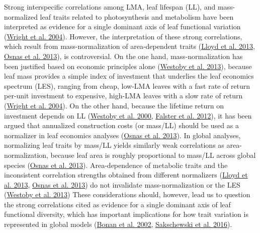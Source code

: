 \documentclass[
  12pt,
  a4paper,
,tablecaptionabove
]{scrartcl}
\begin{document}
Strong interspecific correlations among LMA, leaf lifespan (LL), and mass-normalized leaf traits related to photosynthesis and metabolism have been interpreted as evidence for a single dominant axis of leaf functional variation (\protect\hyperlink{ref-Wright2004a}{Wright et al. 2004}).
However, the interpretation of these strong correlations, which result from mass-normalization of area-dependent traits (\protect\hyperlink{ref-Lloyd2013}{Lloyd et al. 2013}, \protect\hyperlink{ref-Osnas2013}{Osnas et al. 2013}), is controversial.
On the one hand, mass-normalization has been justified based on economic principles alone (\protect\hyperlink{ref-Westoby2013}{Westoby et al. 2013}), because leaf mass provides a simple index of investment that underlies the leaf economics spectrum (LES), ranging from cheap, low-LMA leaves with a fast rate of return per-unit investment to expensive, high-LMA leaves with a slow rate of return (\protect\hyperlink{ref-Wright2004a}{Wright et al. 2004}).
On the other hand, because the lifetime return on investment depends on LL (\protect\hyperlink{ref-Westoby2000}{Westoby et al. 2000}, \protect\hyperlink{ref-Falster2012}{Falster et al. 2012}), it has been argued that annualized construction costs (or mass/LL) should be used as a normalizer in leaf economics analyses (\protect\hyperlink{ref-Osnas2013}{Osnas et al. 2013}).
In global analyses, normalizing leaf traits by mass/LL yields similarly weak correlations as area-normalization, because leaf area is roughly proportional to mass/LL across global species (\protect\hyperlink{ref-Osnas2013}{Osnas et al. 2013}).
Area-dependence of metabolic traits and the inconsistent correlation strengths obtained from different normalizers (\protect\hyperlink{ref-Lloyd2013}{Lloyd et al. 2013}, \protect\hyperlink{ref-Osnas2013}{Osnas et al. 2013}) do not invalidate mass-normalization or the LES (\protect\hyperlink{ref-Westoby2013}{Westoby et al. 2013})
These considerations should, however, lead us to question the strong correlations cited as evidence for a single dominant axis of leaf functional diversity, which has important implications for how trait variation is represented in global models (\protect\hyperlink{ref-Bonan2002}{Bonan et al. 2002}, \protect\hyperlink{ref-Sakschewski2016}{Sakschewski et al. 2016}).
\end{document}

